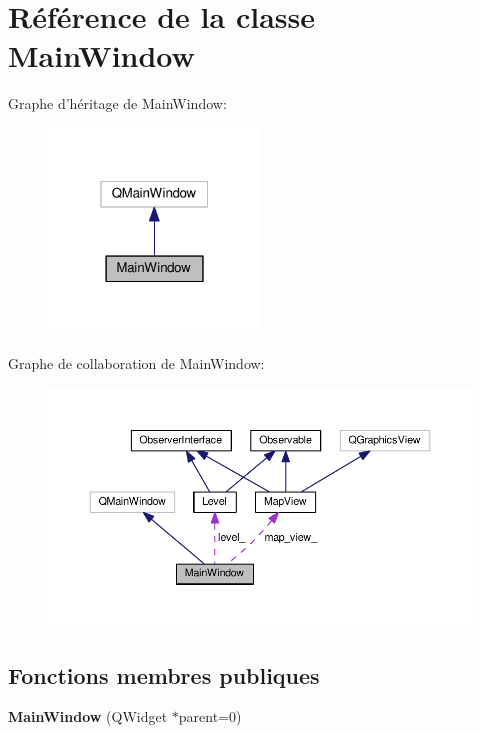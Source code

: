 \hypertarget{classMainWindow}{\section{Référence de la classe Main\+Window}
\label{classMainWindow}
}


Graphe d'héritage de Main\+Window\+:\nopagebreak
\begin{figure}[H]
\begin{center}
\leavevmode
\includegraphics[width=160pt]{d1/d96/classMainWindow__inherit__graph}
\end{center}
\end{figure}


Graphe de collaboration de Main\+Window\+:\nopagebreak
\begin{figure}[H]
\begin{center}
\leavevmode
\includegraphics[width=350pt]{d2/d38/classMainWindow__coll__graph}
\end{center}
\end{figure}
\subsection*{Fonctions membres publiques}
\begin{DoxyCompactItemize}
\item 
\hypertarget{classMainWindow_a8b244be8b7b7db1b08de2a2acb9409db}{{\bfseries Main\+Window} (Q\+Widget $\ast$parent=0)}\label{classMainWindow_a8b244be8b7b7db1b08de2a2acb9409db}

\end{DoxyCompactItemize}
